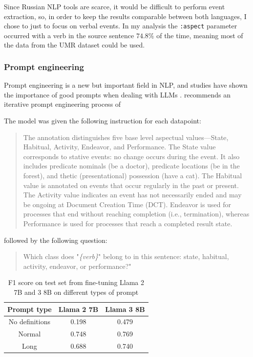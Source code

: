 Since Russian NLP tools are scarce, it would be difficult to perform event extraction, so, in order to keep the results comparable between both languages, I chose to just to focus on verbal events. In my analysis the \texttt{:aspect} parameter occurred with a verb in the source sentence $74.8\%$ of the time, meaning most of the data from the UMR dataset could be used.

\subsubsection*{Prompt engineering}
Prompt engineering is a new but important field in NLP, and studies have shown the importance of good prompts when dealing with LLMs \citep{kaddour2023challenges, hsieh2023automatic, sahoo2024systematic}. \citet{törnberg2024best} recommends an iterative prompt engineering process of 

The model was given the following instruction for each datapoint:
\begin{quotation}
    The annotation distinguishes five base level aspectual values—State, Habitual, Activity, Endeavor, and Performance. The State value corresponds to stative events: no change occurs during the event. It also includes predicate nominals (be a doctor), predicate locations (be in the forest), and thetic (presentational) possession (have a cat). The Habitual value is annotated on events that occur regularly in the past or present. The Activity value indicates an event has not necessarily ended and may be ongoing at Document Creation Time (DCT). Endeavor is used for processes that end without reaching completion (i.e., termination), whereas Performance is used for processes that reach a completed result state. 
\end{quotation}
followed by the following question:
\begin{quotation}
    Which class does "\emph{\{verb\}}" belong to in this sentence: state, habitual, activity, endeavor, or performance?"
\end{quotation}

\begin{table}
    \centering
    \begin{tabular}{|c|c|c|}\hline
        \textbf{Prompt type} & \textbf{Llama 2 7B} & \textbf{Llama 3 8B} \\ \hline
        No definitions & 0.198 & 0.479 \\ \hline
        Normal  & 0.748 & 0.769 \\\hline
        Long & 0.688 & 0.740  \\ \hline
    \end{tabular}
    \caption{F1 score on test set from fine-tuning Llama 2 7B and 3 8B on different types of prompt}
\end{table}

